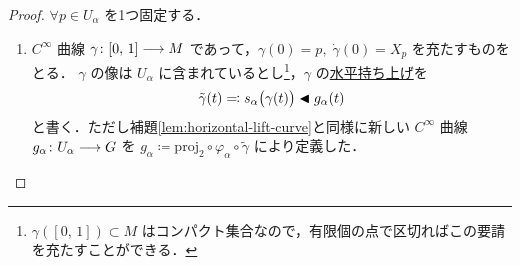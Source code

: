 \documentclass[geometry_main]{subfiles}
\begin{document}
\begin{proof}
    $\forall p \in U_\alpha$ を1つ固定する．
    \begin{enumerate}
        \item 
        $C^\infty$ 曲線 $\gamma \colon [0,\, 1] \longrightarrow M$ であって，$\gamma(0) = p,\; \dot{\gamma}(0) = X_p$ を充たすものをとる．
        $\gamma$ の像は $U_\alpha$ に含まれているとし\footnote{$\gamma([0,\, 1]) \subset M$ はコンパクト集合なので，有限個の点で区切ればこの要請を充たすことができる．}，$\gamma$ の\hyperref[def:horizontal-lift-curve]{水平持ち上げ}を
        \begin{align}
            \tilde{\gamma}(t) \eqqcolon s_\alpha \bigl( \gamma(t) \bigr) \blacktriangleleft g_\alpha(t)
        \end{align}
        と書く．ただし補題\ref{lem:horizontal-lift-curve}と同様に新しい $C^\infty$ 曲線 $g_\alpha \colon U_\alpha \longrightarrow G$ を $g_\alpha \coloneqq \mathrm{proj}_2 \circ \varphi_\alpha \circ \tilde{\gamma}$ により定義した．
    

\end{enumerate}
\end{proof}
\end{document}
